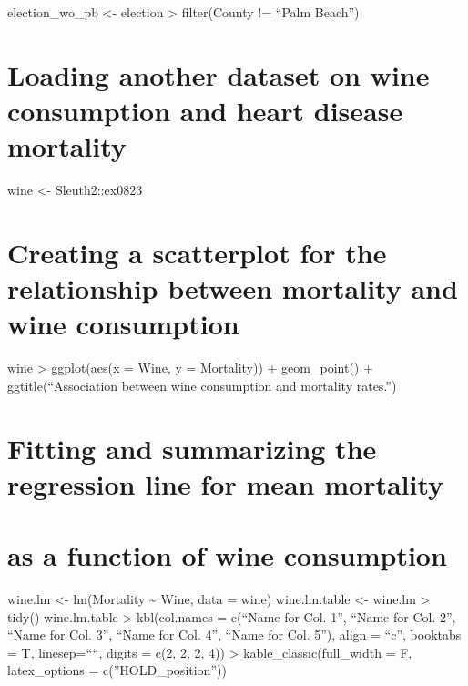 \documentclass[
  letterpaper,
  DIV=11,
  numbers=noendperiod]{scrartcl}
\begin{document}
election\_wo\_pb \textless- election \textbar\textgreater{}
filter(County != ``Palm Beach'')

\hypertarget{loading-another-dataset-on-wine-consumption-and-heart-disease-mortality}{%
\section{Loading another dataset on wine consumption and heart disease
mortality}\label{loading-another-dataset-on-wine-consumption-and-heart-disease-mortality}}

wine \textless- Sleuth2::ex0823

\hypertarget{creating-a-scatterplot-for-the-relationship-between-mortality-and-wine-consumption}{%
\section{Creating a scatterplot for the relationship between mortality
and wine
consumption}\label{creating-a-scatterplot-for-the-relationship-between-mortality-and-wine-consumption}}

wine \textbar\textgreater{} ggplot(aes(x = Wine, y = Mortality)) +
geom\_point() + ggtitle(``Association between wine consumption and
mortality rates.'')

\hypertarget{fitting-and-summarizing-the-regression-line-for-mean-mortality}{%
\section{Fitting and summarizing the regression line for mean
mortality}\label{fitting-and-summarizing-the-regression-line-for-mean-mortality}}

\hypertarget{as-a-function-of-wine-consumption}{%
\section{as a function of wine
consumption}\label{as-a-function-of-wine-consumption}}

wine.lm \textless- lm(Mortality \textasciitilde{} Wine, data = wine)
wine.lm.table \textless- wine.lm \textbar\textgreater{} tidy()
wine.lm.table \textbar\textgreater{} kbl(col.names = c(``Name for Col.
1'', ``Name for Col. 2'', ``Name for Col. 3'', ``Name for Col. 4'',
``Name for Col. 5''), align = ``c'', booktabs = T, linesep=````, digits
= c(2, 2, 2, 4)) \textbar\textgreater{} kable\_classic(full\_width = F,
latex\_options = c(''HOLD\_position''))
\end{document}
